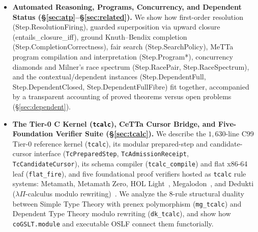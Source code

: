 \documentclass[11pt,a4paper]{article}
\theoremstyle{definition}
\DeclareRobustCommand{\lean}[1]{%
  \ifmmode\text{\normalfont\ttfamily\footnotesize\detokenize{#1}}%
  \else{\normalfont\footnotesize\leanurl{#1}}\fi}
\def\lean#1{#1}%
\begin{document}
\begin{itemize}[leftmargin=1.8em]
\begin{enumerate}[label=(\roman*)]
    \item the \emph{Absence Refutation and Count Squeeze Theorem} (\lean{entails_absent_iff}, \lean{absent_iff_possible_empty}, \lean{Frames.Principal.entails_count_iff}, \lean{count_iff_regions});
    \item the \emph{Henkin Completeness and Herbrand Incompleteness Theorem} (\lean{derives_sound_free}, \lean{derives_complete_generic}, \lean{derives_iff_termModel}, \lean{oneConstant_separates}, \lean{admitsDerivably_iff}); and
    \item the \emph{$4 \times 4$ Evidence Separation Matrix} (\lean{Evidence.Family.profiles_distinct}) over the disequality step (\lean{Disequality.step}).
  \end{enumerate}
  \item \textbf{Automated Reasoning, Programs, Concurrency, and Dependent Status (\S\ref{sec:atp}--\S\ref{sec:related}).}
  We show how first-order resolution (\lean{Step.ResolutionFiring}), guarded superposition via upward closure (\lean{entails_closure_iff}), ground Knuth--Bendix completion (\lean{Step.CompletionCorrectness}), fair search (\lean{Step.SearchPolicy}), MeTTa program compilation and interpretation (\lean{Step.Program*}), concurrency diamonds and Milner's race spectrum (\lean{Step.RacePair}, \lean{Step.RaceSpectrum}), and the contextual/dependent instances (\lean{Step.DependentFull}, \lean{Step.DependentClosed}, \lean{Step.DependentFullFibre}) fit together, accompanied by a transparent accounting of proved theorems versus open problems (\S\ref{sec:dependent}).
  \item \textbf{The Tier-0 C Kernel (\texttt{tcalc}), CeTTa Cursor Bridge, and Five-Foundation Verifier Suite (\S\ref{sec:tcalc}).}
  We describe the $1{,}630$-line C99 Tier-0 reference kernel (\texttt{tcalc}), its modular prepared-step and candidate-cursor interface (\texttt{TcPreparedStep}, \texttt{TcAdmissionReceipt}, \texttt{TcCandidateCursor}), its schema compiler (\texttt{tcalc\_compile}) and flat x86-64 leaf (\texttt{flat\_fire}), and five foundational proof verifiers hosted as \texttt{tcalc} rule systems: Metamath, Metamath Zero, HOL Light~\cite{Harrison2009HOLLight}, Megalodon~\cite{Brown2019Megalodon}, and Dedukti ($\lambda\Pi$-calculus modulo rewriting)~\cite{CousineauDowek2007LPModulo,Barendregt1992LambdaCalculi}. We analyze the 8-rule structural duality between Simple Type Theory with prenex polymorphism (\texttt{mg\_tcalc}) and Dependent Type Theory modulo rewriting (\texttt{dk\_tcalc}), and show how \texttt{coGSLT.module} and executable OSLF connect them functorially.
\end{itemize}
\end{document}
